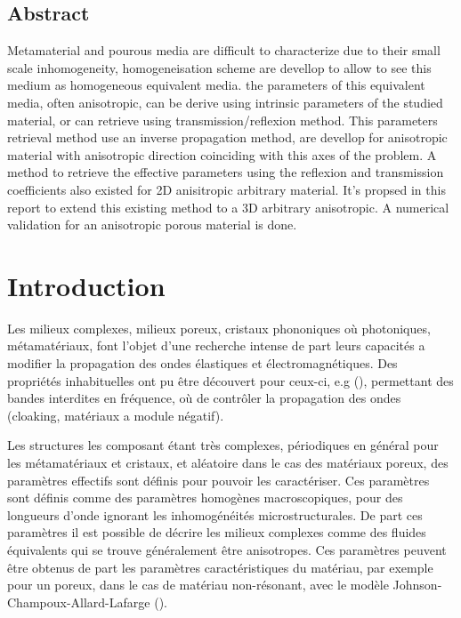 \documentclass[twoside,openright]{report}
\begin{document}
\section*{Abstract}
    Metamaterial and pourous media are difficult to characterize due to their small scale inhomogeneity, homogeneisation scheme are devellop to allow to see this medium as homogeneous equivalent media. the parameters of this equivalent media, often anisotropic, can be derive using intrinsic parameters of the studied material, or can retrieve using transmission/reflexion method. This parameters retrieval method use an inverse propagation method, are devellop for anisotropic material with anisotropic direction coinciding with this axes of the problem. A method to retrieve the effective parameters using the reflexion and transmission coefficients also existed for 2D anisitropic arbitrary material.
    It's propsed in this report to extend this existing method to a 3D arbitrary anisotropic. A numerical validation for an anisotropic porous material is done.
    
    
\newpage
\tableofcontents
\listoffigures

\newpage
\chapter*{Introduction}
 \setcounter{page}{1}
   
    Les milieux complexes, milieux poreux, cristaux phononiques où photoniques, métamatériaux, font l'objet d'une recherche intense de part leurs capacités a modifier la propagation des ondes élastiques et électromagnétiques. Des propriétés inhabituelles ont pu être découvert pour ceux-ci, e.g (\cite{Liu2000}\cite{Fang}\cite{Pendry}\cite{Cummer}), permettant des bandes interdites en fréquence, où de contrôler la propagation des ondes (cloaking, matériaux a module négatif).
    
    Les structures les composant étant très complexes, périodiques en général pour les métamatériaux et cristaux, et aléatoire dans le cas des matériaux poreux, des paramètres effectifs sont définis pour pouvoir les caractériser. Ces paramètres sont définis comme des paramètres homogènes macroscopiques, pour des longueurs d'onde ignorant les inhomogénéités microstructurales. De part ces paramètres il est possible de décrire les milieux complexes comme des fluides équivalents qui se trouve généralement être anisotropes. Ces paramètres peuvent être obtenus de part les paramètres caractéristiques du matériau, par exemple pour un poreux, dans le cas de matériau non-résonant, avec le modèle Johnson-Champoux-Allard-Lafarge (\cite{Johnson}\cite{Allard}\cite{Lafarge}). 
    
\end{document}
